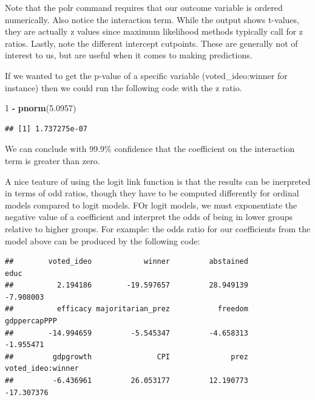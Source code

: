 \documentclass[]{book}
\newenvironment{Shaded}{\begin{snugshade}}{\end{snugshade}}
\newcommand{\KeywordTok}[1]{\textcolor[rgb]{0.13,0.29,0.53}{\textbf{#1}}}
\newcommand{\DecValTok}[1]{\textcolor[rgb]{0.00,0.00,0.81}{#1}}
\newcommand{\FloatTok}[1]{\textcolor[rgb]{0.00,0.00,0.81}{#1}}
\newcommand{\StringTok}[1]{\textcolor[rgb]{0.31,0.60,0.02}{#1}}
\newcommand{\OperatorTok}[1]{\textcolor[rgb]{0.81,0.36,0.00}{\textbf{#1}}}
\newcommand{\NormalTok}[1]{#1}
\begin{document}
Note that the polr command requires that our outcome variable is ordered
numerically. Also notice the interaction term. While the output shows
t-values, they are actually z values since maximum likelihood methods
typically call for z ratios. Lastly, note the different intercept
cutpoints. These are generally not of interest to us, but are useful
when it comes to making predictions.

If we wanted to get the p-value of a specific variable
(voted\_ideo:winner for instance) then we could run the following code
with the z ratio.

\begin{Shaded}
\begin{Highlighting}[]
\DecValTok{1} \OperatorTok{-}\StringTok{ }\KeywordTok{pnorm}\NormalTok{(}\FloatTok{5.0957}\NormalTok{)}
\end{Highlighting}
\end{Shaded}

\begin{verbatim}
## [1] 1.737275e-07
\end{verbatim}

We can conclude with 99.9\% confidence that the coefficient on the
interaction term is greater than zero.

A nice teature of using the logit link function is that the results can
be inerpreted in terms of odd ratios, though they have to be computed
differently for ordinal models compared to logit models. FOr logit
models, we must exponentiate the negative value of a coefficient and
interpret the odds of being in lower groups relative to higher groups.
For example: the odds ratio for our coefficients from the model above
can be produced by the following code:

\begin{Shaded}
\end{Shaded}

\begin{verbatim}
##        voted_ideo            winner         abstained              educ 
##          2.194186        -19.597657         28.949139         -7.908003 
##          efficacy majoritarian_prez           freedom      gdppercapPPP 
##        -14.994659         -5.545347         -4.658313         -1.955471 
##         gdpgrowth               CPI              prez voted_ideo:winner 
##         -6.436961         26.053177         12.190773        -17.307376
\end{verbatim}
\end{document}
